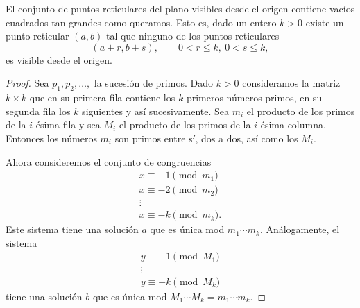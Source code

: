 \documentclass[12pt,a4paper]{book}
\begin{document}
    \begin{teorema}
        El conjunto de puntos reticulares del plano visibles desde el origen contiene
        vacíos cuadrados tan grandes como queramos. Esto es, dado un entero $k>0$ existe
        un punto reticular $(a,b)$ tal que ninguno de los puntos reticulares
        \begin{equation*}
            (a+r,b+s),\qquad0<r\leq k,\ 0<s\leq k,
        \end{equation*}
        es visible desde el origen.
    \end{teorema}

    \begin{proof}
        Sea $p_{1},p_{2},\dots,$ la sucesión de primos. Dado $k>0$ consideramos la matriz
        $k\times k$ que en su primera fila contiene los $k$ primeros números primos, en su
        segunda fila los $k$ siguientes y así sucesivamente. Sea $m_{i}$ el producto de los
        primos de la $i$-ésima fila y sea $M_{i}$ el producto de los primos de la
        $i$-ésima columna. Entonces los números $m_{i}$ son primos entre sí, dos a dos, así
        como los $M_{i}$.

        Ahora consideremos el conjunto de congruencias
        \begin{gather*}
            x\equiv-1\pmod{m_{1}}\\
            x\equiv-2\pmod{m_{2}}\\
            \vdots\\
            x\equiv-k\pmod{m_{k}}.
        \end{gather*}
        Este sistema tiene una solución $a$ que es única mod $m_{1}\cdots m_{k}$.
        Análogamente, el sistema
        \begin{gather*}
            y\equiv-1\pmod{M_{1}}\\
            \vdots\\
            y\equiv-k\pmod{M_{k}}
        \end{gather*}
        tiene una solución $b$ que es única mod $M_{1}\cdots M_{k}=m_{1}\cdots m_{k}$.


\end{proof}
\end{document}
